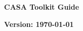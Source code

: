 \pagestyle{empty}

\Huge
\begin{center}
{\bf CASA Toolkit Guide}

\end{center}
\normalsize

\begin{figure}[h!]
\begin{center}
\end{center}
\end{figure}

\begin{figure}[h!]
\begin{center}
\end{center}
\end{figure}

\Large
\begin{center}
{\bf Version: \today}
\end{center}
\normalsize

\pagebreak
